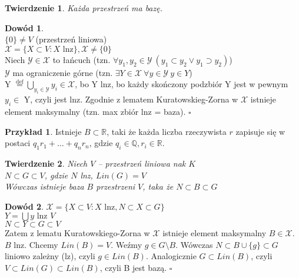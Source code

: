 \documentclass[12pt,a4paper]{article}
\newcommand{\RR}{\mathbb{R}}
\renewcommand{\qed}{$\square$}
\theoremstyle{plain}
\newtheorem{tw}{Twierdzenie}[section]
\theoremstyle{definition}
\theoremstyle{definition}
\theoremstyle{definition}
\theoremstyle{definition}
\newtheorem*{dd}{Dowód}
\theoremstyle{definition}
\newtheorem*{prz}{Przykład}
\theoremstyle{definition}
\theoremstyle{definition}
\theoremstyle{definition}
\begin{document}
\begin{tw} Każda przestrzeń ma bazę.
\end{tw}

\begin{dd} 
    ~\\
    $ \{0\} \neq V $ (przestrzeń liniowa) \\
    $ \mathcal{X} = \{ X \subset V : X \text{ lnz} \}, \mathcal{X}  \neq \{0\}$ \\
    Niech $\mathcal{Y} \in \mathcal{X} $ to łańcuch (tzn. $\forall y_1, y_2 \in \mathcal{Y} \ (y_1 \subset y_2 \lor y_1 \supset y_2)$) \\
    $\mathcal{Y}$ ma ograniczenie górne (tzn. $\exists Y \in \mathcal{X} \ \forall y \in \mathcal{Y} \ y \in Y$) \\
    Y $\overset{\mathrm{def}}{=} \bigcup\limits_{y_i \in \mathcal{Y}} y_i \in \mathcal{X}$, bo Y lnz, bo każdy skończony podzbiór Y jest w pewnym $y_i \in $ Y, czyli jest lnz.
    Zgodnie z lematem Kuratowskieg-Zorna w $\mathcal{X}$ istnieje element maksymalny (tzn. max zbiór lnz = baza). \qed
\end{dd}

\begin{prz}
    Istnieje $ B \subset \RR $, taki że każda liczba rzeczywista $ r $ zapisuje się w postaci
    $ q_1r_1 + \dots + q_nr_n $, gdzie $ q_i \in \mathbb{Q}, r_i \in \RR $.
\end{prz}

\begin{tw} 
    Niech $ V $ -- przestrzeń liniowa nak $ K $\\
    $ N \subset G \subset V$, gdzie $ N $ lnz, $Lin(G) = V$\\
    Wówczas istnieje baza $ B $ przestrzeni $ V $, taka że $ N \subset B \subset G $
\end{tw}

\begin{dd}
    $ \mathcal{X} = \{ X \subset V : X \text{ lnz} , N \subset X \subset G\}$ \\
    $ Y = \bigcup y \text{ lnz } V$ \\
    $ N \subset Y \subset G \subset V $ \\
    Zatem z lematu Kuratowskiego-Zorna w $\mathcal{X} $ istnieje element maksymalny  $B \in \mathcal{X}.$
    $B$ lnz. Chcemy $Lin(B) = V$. Weźmy $g \in G \setminus B.$ Wówczas $N \subset B \cup \{g\} \subset G $ liniowo zależny (lz), czyli $g \in Lin(B)$. Analogicznie $G \subset Lin(B)$, czyli $V \subset Lin(G) \subset Lin(B)$, czyli B jest bazą. \qed
\end{dd}
\end{document}
